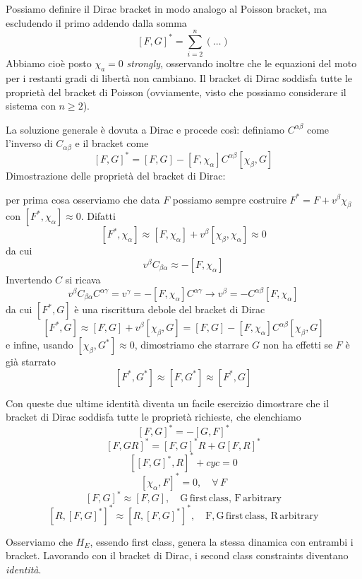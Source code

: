 \documentclass[a4paper, 11pt]{article}
\begin{document}
	Possiamo definire il Dirac bracket in modo analogo al Poisson bracket, ma escludendo il primo addendo dalla somma
	\[ [F,G]^* = \sum_{i=2}^{n} (\dots) \]
	Abbiamo cioè posto $\chi_a=0$ \emph{strongly}, osservando inoltre che le equazioni del moto per i restanti gradi di libertà non cambiano. Il bracket di Dirac soddisfa tutte le proprietà del bracket di Poisson (ovviamente, visto che possiamo considerare il sistema con $n\ge 2$).
	
	\vspace{5mm}
	La soluzione generale è dovuta a Dirac e procede così: definiamo $C^{\alpha\beta}$ come l'inverso di $C_{\alpha\beta}$ e il bracket come
	\[ [F,G]^* = [F, G] - [F, \chi_\alpha] C^{\alpha\beta} [\chi_\beta, G] \]
	Dimostrazione delle proprietà del bracket di Dirac:
	
	per prima cosa osserviamo che data $F$ possiamo sempre costruire $F^*=F+v^\beta\chi_\beta$ con $[F^*, \chi_\alpha] \approx 0$. Difatti
	\[ [F^*, \chi_\alpha] \approx [F, \chi_\alpha] + v^\beta [\chi_\beta, \chi_\alpha] \approx 0 \]
	da cui
	\[ v^\beta C_{\beta\alpha} \approx - [F, \chi_\alpha] \]
	Invertendo $C$ si ricava
	\[ v^\beta C_{\beta\alpha} C^{\alpha\gamma} = v^\gamma = -[F, \chi_\alpha] C^{\alpha\gamma}\rightarrow v^\beta = -C^{\alpha\beta} [F, \chi_\alpha] \]
	da cui $[F^*, G]$ è una riscrittura debole del bracket di Dirac
	\[ [F^*, G] \approx [F, G] + v^\beta [\chi_\beta, G] = [F, G] - [F,\chi_\alpha] C^{\alpha\beta} [\chi_\beta, G] \]
	e infine, usando $[\chi_\beta, G^*] \approx 0$, dimostriamo che starrare $G$ non ha effetti se $F$ è già starrato
	\[ [F^*, G^*] \approx [F, G^*] \approx [F^*, G] \]

	Con queste due ultime identità diventa un facile esercizio dimostrare che il bracket di Dirac soddisfa tutte le proprietà richieste, che elenchiamo
	\[ [F,G]^* = -[G, F]^* \]
	\[ [F, GR]^* = [F,G]^* R + G[F,R]^* \]
	\[ [[F,G]^*, R]^* + cyc = 0 \]
	\[ [\chi_\alpha, F]^* = 0,\quad \forall\,F \]
	\[ [F, G]^* \approx [F, G],\quad \mathrm{G\, first\, class,\, F\, arbitrary} \]
	\[ [R, [F, G]^*]^* \approx [R, [F, G]^*]^*,\quad \mathrm{F,G\, first\, class,\, R\, arbitrary} \]
	
	Osserviamo che $H_E$, essendo first class, genera la stessa dinamica con entrambi i bracket.
	Lavorando con il bracket di Dirac, i second class constraints diventano \emph{identità}.
	
\end{document}
